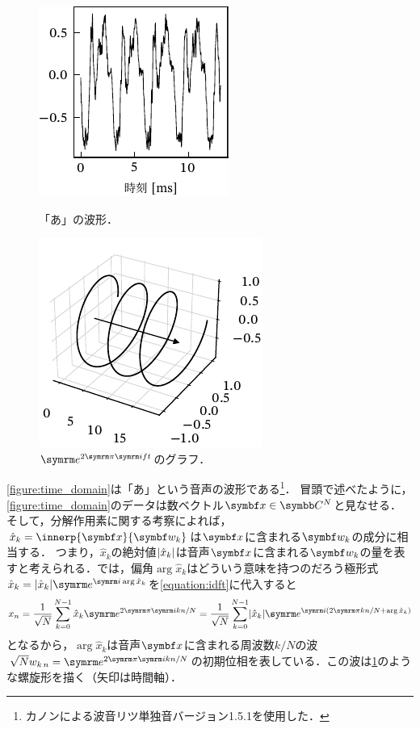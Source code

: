 \documentclass[../../main]{subfiles}
\begin{document}
\begin{figure}[htbp]
  \begin{minipage}{\linewidth/2}
    \centering
    \begin{minipage}[t][45mm][c]{\linewidth}
      \centering
      \includegraphics{figures/time_domain.pdf}
    \end{minipage}
    \caption{「あ」の波形．}
    \label{figure:time_domain}
  \end{minipage}%
  \begin{minipage}{\linewidth/2}
    \centering
    \includegraphics{figures/helix.pdf}
    \caption{\(\napr^{2\krez\iuni ft}\)のグラフ．}
    \label{figure:complex_sinusoid}
  \end{minipage}
\end{figure}

\cref{figure:time_domain}は「あ」という音声の波形である\footnote{カノン\cite{canon}による波音リツ単独音バージョン1.5.1を使用した．}．
冒頭で述べたように，\cref{figure:time_domain}のデータは数ベクトル\(\vect{x}\in\numset{C}^N\)と見なせる．
そして，分解作用素に関する考察によれば，\(\hat{x}_k=\innerp{\vect{x}}{\vect{w}_k}\)は\(\vect{x}\)に含まれる\(\vect{w}_k\)の成分に相当する．
つまり，\(\hat{x}_k\)の絶対値\(\lvert\hat{x}_k\rvert\)は音声\(\vect{x}\)に含まれる\(\vect{w}_k\)の量を表すと考えられる．では，偏角\(\arg\hat{x}_k\)はどういう意味を持つのだろう\？極形式\(\hat{x}_k=\abs{\hat{x}_k}\napr^{\iuni\arg\hat{x}_k}\)を\cref{equation:idft}に代入すると
\[
  x_n = \frac{1}{\sqrt{N}}\sum_{k=0}^{N-1}\hat{x}_k\napr^{2\krez\iuni kn/N}
  = \frac{1}{\sqrt{N}}\sum_{k=0}^{N-1}\abs{\hat{x}_k}\napr^{\iuni(2\krez kn/N+\arg\hat{x}_k)}
\]
となるから，\(\arg\hat{x}_k\)は音声\(\vect{x}\)に含まれる周波数\(k/N\)の波\(\sqrt{N}\midx{w}{k}{n}=\napr^{2\krez\iuni kn/N}\)の初期位相を表している．この波は\cref{figure:complex_sinusoid}のような螺旋形を描く（矢印は時間軸）．
\end{document}
